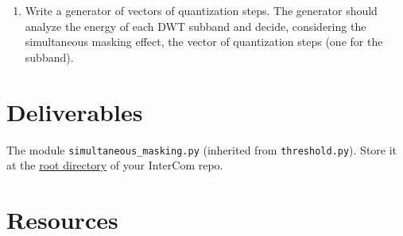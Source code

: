 \begin{enumerate}
\item Write a generator of vectors of quantization steps. The
  generator should analyze the energy of each DWT subband and decide,
  considering the simultaneous masking effect, the vector of
  quantization steps (one for the subband).
\end{enumerate}

\section{Deliverables}

The module \verb|simultaneous_masking.py| (inherited from
\verb|threshold.py|). Store it at the
\href{https://github.com/Tecnologias-multimedia/intercom}{root
  directory} of your InterCom repo.

\section{Resources}



